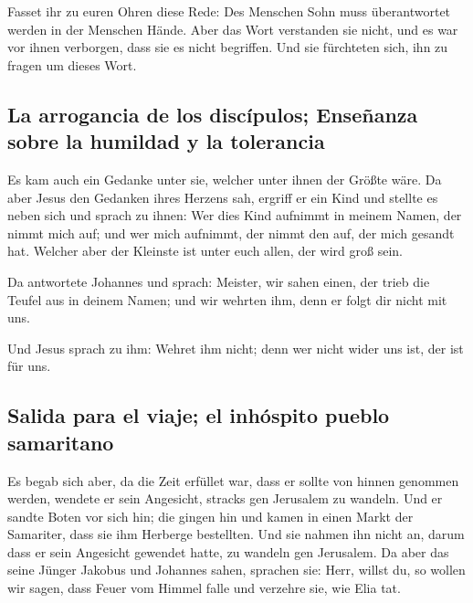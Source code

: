  Fasset ihr zu euren Ohren diese Rede: Des Menschen Sohn
muss überantwortet werden in der Menschen Hände.  Aber
das Wort verstanden sie nicht, und es war vor ihnen verborgen, dass sie
es nicht begriffen. Und sie fürchteten sich, ihn zu fragen um dieses
Wort.

\hypertarget{la-arrogancia-de-los-discuxedpulos-enseuxf1anza-sobre-la-humildad-y-la-tolerancia}{%
\subsection{La arrogancia de los discípulos; Enseñanza sobre la humildad
y la
tolerancia}\label{la-arrogancia-de-los-discuxedpulos-enseuxf1anza-sobre-la-humildad-y-la-tolerancia}}

 Es kam auch ein Gedanke unter sie, welcher unter ihnen
der Größte wäre.  Da aber Jesus den Gedanken ihres
Herzens sah, ergriff er ein Kind und stellte es neben sich
 und sprach zu ihnen: Wer dies Kind aufnimmt in meinem
Namen, der nimmt mich auf; und wer mich aufnimmt, der nimmt den auf, der
mich gesandt hat. Welcher aber der Kleinste ist unter euch allen, der
wird groß sein.

 Da antwortete Johannes und sprach: Meister, wir sahen
einen, der trieb die Teufel aus in deinem Namen; und wir wehrten ihm,
denn er folgt dir nicht mit uns.

 Und Jesus sprach zu ihm: Wehret ihm nicht; denn wer
nicht wider uns ist, der ist für uns.

\hypertarget{salida-para-el-viaje-el-inhuxf3spito-pueblo-samaritano}{%
\subsection{Salida para el viaje; el inhóspito pueblo
samaritano}\label{salida-para-el-viaje-el-inhuxf3spito-pueblo-samaritano}}

 Es begab sich aber, da die Zeit erfüllet war, dass er
sollte von hinnen genommen werden, wendete er sein Angesicht, stracks
gen Jerusalem zu wandeln.  Und er sandte Boten vor sich
hin; die gingen hin und kamen in einen Markt der Samariter, dass sie ihm
Herberge bestellten.  Und sie nahmen ihn nicht an, darum
dass er sein Angesicht gewendet hatte, zu wandeln gen Jerusalem.
 Da aber das seine Jünger Jakobus und Johannes sahen,
sprachen sie: Herr, willst du, so wollen wir sagen, dass Feuer vom
Himmel falle und verzehre sie, wie Elia tat.

